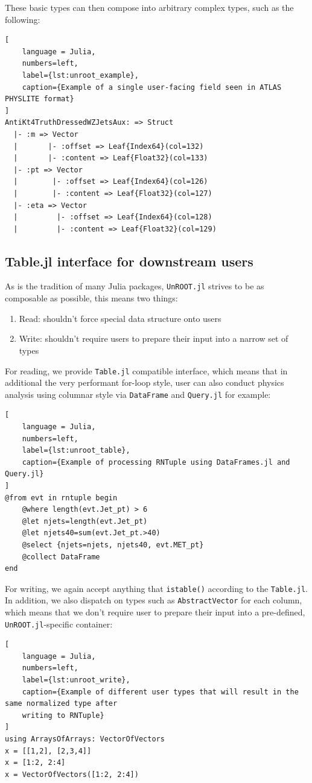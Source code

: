 \documentclass{juliacon}
\begin{document}
These basic types can then compose into arbitrary complex types, such as the following:
\begin{lstlisting}[
    language = Julia, 
    numbers=left, 
    label={lst:unroot_example}, 
    caption={Example of a single user-facing field seen in ATLAS PHYSLITE format}
]
AntiKt4TruthDressedWZJetsAux: => Struct
  |- :m => Vector
  |       |- :offset => Leaf{Index64}(col=132)
  |       |- :content => Leaf{Float32}(col=133)
  |- :pt => Vector
  |        |- :offset => Leaf{Index64}(col=126)
  |        |- :content => Leaf{Float32}(col=127)
  |- :eta => Vector
  |         |- :offset => Leaf{Index64}(col=128)
  |         |- :content => Leaf{Float32}(col=129)
\end{lstlisting}

\subsection{Table.jl interface for downstream users}

As is the tradition of many Julia packages, \verb|UnROOT.jl| strives to be as composable as
possible, this means two things:
\begin{enumerate}
    \item Read: shouldn’t force special data structure onto users

    \item Write: shouldn’t require users to prepare their input into a narrow set of types

\end{enumerate}

For reading, we provide \verb|Table.jl| compatible interface, which means that in additional the
very performant for-loop style, user can also conduct physics analysis using columnar style via
\verb|DataFrame| and \verb|Query.jl| for example:

\begin{lstlisting}[
    language = Julia, 
    numbers=left, 
    label={lst:unroot_table}, 
    caption={Example of processing RNTuple using DataFrames.jl and Query.jl}
]
@from evt in rntuple begin
    @where length(evt.Jet_pt) > 6
    @let njets=length(evt.Jet_pt)
    @let njets40=sum(evt.Jet_pt.>40)
    @select {njets=njets, njets40, evt.MET_pt}
    @collect DataFrame
end
\end{lstlisting}

For writing, we again accept anything that \verb|istable()| according to the \verb|Table.jl|. In
addition, we also dispatch on types such as \verb|AbstractVector| for each column, which means that
we don't require user to prepare their input into a pre-defined, \verb|UnROOT.jl|-specific container:
\begin{lstlisting}[
    language = Julia, 
    numbers=left, 
    label={lst:unroot_write}, 
    caption={Example of different user types that will result in the same normalized type after
    writing to RNTuple}
]
using ArraysOfArrays: VectorOfVectors
x = [[1,2], [2,3,4]]
x = [1:2, 2:4]
x = VectorOfVectors([1:2, 2:4])
\end{lstlisting}
\end{document}
